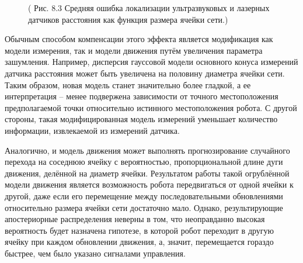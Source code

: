 \documentclass[10pt,a4paper]{article}
\begin{document}
\begin{figure}[H]
	\caption{ (  Рис. 8.3 Средняя ошибка локализации ультразвуковых и лазерных датчиков расстояния как функция размера ячейки сети.)}
	\label{fig:83orig}
\end{figure}

Обычным способом компенсации этого эффекта является модификация как модели измерения, так и модели движения путём увеличения параметра зашумления. Например, дисперсия гауссовой модели основного конуса измерений датчика расстояния может быть увеличена на половину диаметра ячейки сети. Таким образом, новая модель станет значительно более гладкой, а ее интерпретация – менее подвержена зависимости от точного местоположения предполагаемой точки относительно истинного местоположения робота. С другой стороны, такая модифицированная модель измерений уменьшает количество информации, извлекаемой из измерений датчика.

Аналогично, и модель движения может выполнять прогнозирование случайного перехода на соседнюю ячейку с вероятностью, пропорциональной длине дуги движения, делённой на диаметр ячейки. Результатом работы такой огрублённой модели движения является возможность робота передвигаться от одной ячейки к другой, даже если его перемещение между последовательными обновлениями  относительно размера ячейки сети достаточно мало. Однако, результирующие апостериорные распределения неверны в том, что неоправданно высокая вероятность будет назначена гипотезе, в которой робот переходит в другую ячейку при каждом обновлении движения, а, значит, перемещается гораздо быстрее, чем было указано сигналами управления. 
\end{document}
